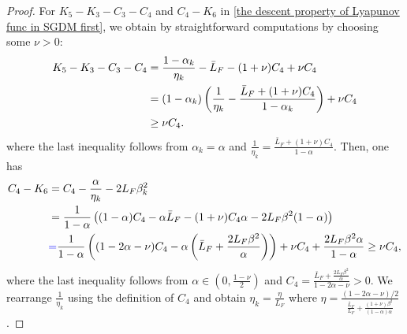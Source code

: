 \begin{proof}
    For $K_{5}- K_{3}- C_{3}- C_{4}$ and $C_{4}- K_{6}$ in \eqref{the descent property of Lyapunov func in SGDM first},
    we obtain by straightforward computations by choosing some $\nu > 0$:
    {\begin{align}
        K_{5}- K_{3}- C_{3}- C_{4}
        &= \frac{1 - \alpha_{k}}{\eta_{k}}- \bar{L}_{F}- (1 + \nu)C_{4}+ \nu C_{4}\notag\\
        &= (1 - \alpha_{k})\left(\frac{1}{\eta_{k}}- \frac{\bar{L}_{F}+ (1 + \nu)C_{4}}{1 - \alpha_{k}}\right) + \nu C_{4}\notag \\
        &\geq \nu C_{4}. \notag %
    \end{align}}
    where the last inequality follows from $\alpha_{k}= \alpha$ and
    $\frac{1}{\eta_{k}}= \frac{\bar{L}_{F}+ (1 + \nu)C_{4}}{1 - \alpha}$. Then, 
    one has
    \begin{align}
        C_{4}- K_{6} & = C_{4}- \frac{\alpha}{\eta_{k}}- 2L_{F}\beta_{k}^{2}\notag                                                                                                                                   \\
                     & = \frac{1}{1 - \alpha}\left( (1 - \alpha)C_{4}- \alpha\bar{L}_{F}- (1 + \nu)C_{4}\alpha - 2L_{F}\beta^{2}(1 - \alpha) \right)\notag                                                           \\
                     & \blue{=} \frac{1}{1 - \alpha}\left( (1 - 2\alpha - \nu)C_{4}- \alpha \left(\bar{L}_{F}+ \frac{2L_{F}\beta^{2}}{\alpha}\right) \right) + \nu C_{4}+ \frac{2L_{F}\beta^{2}\alpha}{1 - \alpha} \geq \nu C_{4},\notag %
    \end{align}where the last inequality follows from $\alpha \in (0, \frac{1 - \nu}{2})$
    and
    $C_{4}= \frac{\bar{L}_{F}+ \frac{2L_F \beta^2}{\alpha}}{1 - 2\alpha - \nu}> 0$.
    We rearrange $\frac{1}{\eta_{k}}$ using the definition of $C_{4}$ and obtain
    $\eta_{k}= \frac{\eta}{L_{F}}$ where $\eta = \frac{(1 - 2\alpha - \nu)/2}{\frac{\bar{L}_{F}}{L_{F}}
    + \frac{(1 + \nu)\beta^{2}}{(1 - \alpha)\alpha}}$.


\end{proof}
